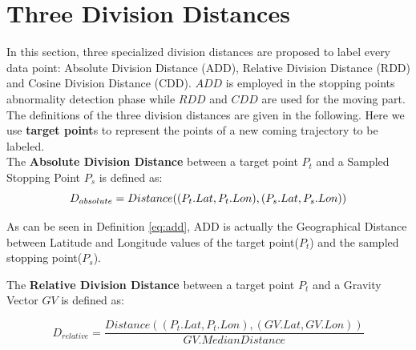 \documentclass[12pt,glossary]{dalcsthesis}
\begin{document}
\section{Three Division Distances}
\label{sec:three_division_distances}

In this section,  three specialized division distances are proposed to label every data point: Absolute Division Distance (ADD), Relative Division Distance (RDD) and Cosine Division Distance (CDD). $ADD$ is employed in the stopping points abnormality detection phase while $RDD$ and $CDD$ are used for the moving part. The definitions of the three division distances are given in the following. Here we use \textbf{target point}s to represent the points of a new coming trajectory to be labeled.\\

The \textbf{Absolute Division Distance} between a target point $P_t$ and a Sampled Stopping Point $P_s$ is defined as:
\begin{equation}
\label{eq:add}
D_{absolute} = \\
Distance((P_t.Lat,P_t.Lon),(P_s.Lat,P_s.Lon))
\end{equation}



As can be seen in Definition \ref{eq:add}, ADD is actually the Geographical Distance \cite{gpsDistance} between %
Latitude and Longitude values of the target point($P_t$) and the sampled stopping point($P_s$). %

The \textbf{Relative Division Distance} between a target point $P_t$ and a Gravity Vector $GV$ is defined as:

\begin{equation}
\label{eq:rdd}
D_{relative} = \frac{Distance((P_t.Lat,P_t.Lon),(GV.Lat,GV.Lon))}{GV.MedianDistance}
\end{equation}


\end{document}
